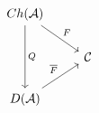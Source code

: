 \documentclass[12pt]{standalone}
\begin{document}
        $$

\begin{tikzcd}
    Ch(\mathcal A) \ar[dd,"Q"] \ar[dr,"F"] & \\
    & \mathcal C \\
    D(\mathcal A) \ar[ur,"\overline{F}"] & 
\end{tikzcd}
        $$
        
\end{document}
